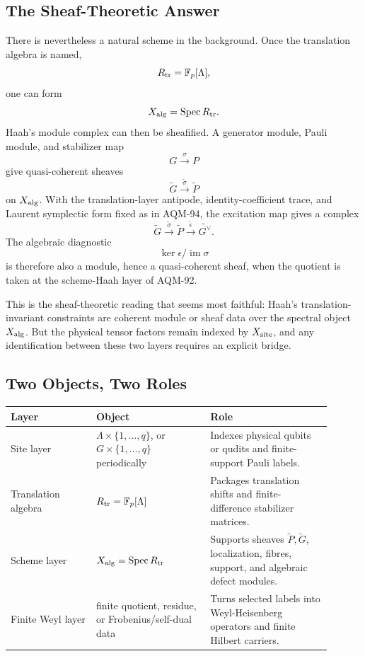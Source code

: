 \subsection{The Sheaf-Theoretic Answer}

There is nevertheless a natural scheme in the background.  Once the
translation algebra is named,
\[
  R_{\rm tr}=\mathbb F_p[\Lambda],
\]
one can form
\[
  X_{\rm alg}=\operatorname{Spec} R_{\rm tr}.
\]
Haah's module complex can then be sheafified.  A generator module, Pauli module,
and stabilizer map
\[
  G\xrightarrow{\sigma}P
\]
give quasi-coherent sheaves
\[
  \widetilde G\xrightarrow{\widetilde\sigma}\widetilde P
\]
on \(X_{\rm alg}\).  With the translation-layer antipode, identity-coefficient
trace, and Laurent symplectic form fixed as in AQM-94, the excitation map gives
a complex
\[
  \widetilde G
  \xrightarrow{\widetilde\sigma}
  \widetilde P
  \xrightarrow{\widetilde\epsilon}
  \widetilde{G^\vee}.
\]
The algebraic diagnostic
\[
  \ker\epsilon/\operatorname{im}\sigma
\]
is therefore also a module, hence a quasi-coherent sheaf, when the quotient is
taken at the scheme-Haah layer of AQM-92.

This is the sheaf-theoretic reading that seems most faithful: Haah's
translation-invariant constraints are coherent module or sheaf data over the
spectral object \(X_{\rm alg}\).  But the physical tensor factors remain
indexed by \(X_{\rm site}\), and any identification between these two layers
requires an explicit bridge.

\subsection{Two Objects, Two Roles}

\begin{center}
\small\setlength{\tabcolsep}{3pt}
\begin{tabular}{p{0.24\linewidth}p{0.32\linewidth}p{0.34\linewidth}}
\textbf{Layer} & \textbf{Object} & \textbf{Role} \\
\hline
Site layer & \(\Lambda\times\{1,\ldots,q\}\), or
\(G\times\{1,\ldots,q\}\) periodically &
Indexes physical qubits or qudits and finite-support Pauli labels. \\
Translation algebra & \(R_{\rm tr}=\mathbb F_p[\Lambda]\) &
Packages translation shifts and finite-difference stabilizer matrices. \\
Scheme layer & \(X_{\rm alg}=\operatorname{Spec} R_{\rm tr}\) &
Supports sheaves \(\widetilde P,\widetilde G\), localization, fibres, support,
and algebraic defect modules. \\
Finite Weyl layer & finite quotient, residue, or Frobenius/self-dual data &
Turns selected labels into Weyl-Heisenberg operators and finite Hilbert
carriers. \\
\end{tabular}
\end{center}

